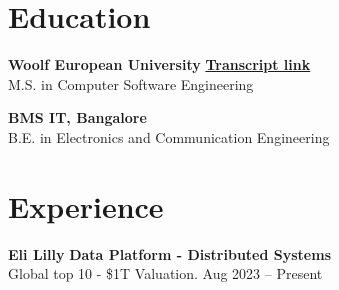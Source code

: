 \documentclass[11 pt]{article}
\begin{document}
\section*{\textbf{Education}}

\noindent
\textbf{Woolf European University} \hfill \href{https://woolf.university/id/151331132?token=eyJhbGciOiJIUzI1NiJ9.eyJpZCI6IjA5MDUyMTNjLTQxMTMtNGM2MS1hZmE3LTdkZGFiNWYyOGM5NyIsImlzcyI6InVybjpXb29sZlVuaXZlcnNpdHk6c2VydmVyL3NlcnZpY2UvYWNjZXNzIiwiaXNWZXJpZmllZCI6dHJ1ZSwia2luZCI6Im9hdXRoIiwib3JnIjp7Imdyb3VwcyI6W10sImlkIjoiOWIxN2Y1Y2UtMTA3OC00ZmRmLWFlYzAtMDJiZjRlY2ZiMGE2In0sInNjb3BlIjoiKiJ9.f-CFNfydAn-GSaAiGUkWhNAT3Yn_P7C0O7cjrRH7Eq4} {\textbf{Transcript link}} \ \\
\small M.S. in Computer Software Engineering

\vspace{6pt}

\noindent\textbf{BMS IT, Bangalore}  \\
\small B.E. in Electronics and Communication Engineering

\section*{\textbf{Experience}}

\noindent
{\normalsize\textbf{Eli Lilly}} \hfill \small{\textbf{Data Platform - Distributed Systems}} \\
{Global top 10 - \$1T Valuation. \hfill Aug 2023 -- Present}
\end{document}

